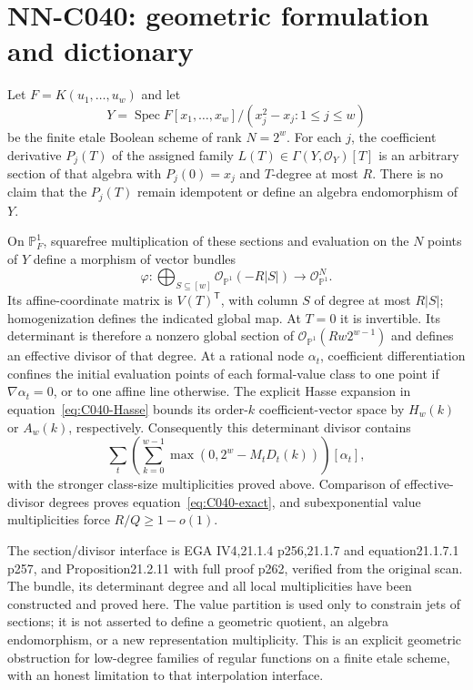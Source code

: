 \section{NN-C040: geometric formulation and dictionary}
\begin{geometricstatement}[NN-C040]
Let $F=K(u_1,\ldots,u_w)$ and let
\[
             Y=\operatorname{Spec}
             F[x_1,\ldots,x_w]/(x_j^2-x_j:1\le j\le w)
\]
be the finite etale Boolean scheme of rank $N=2^w$. For each $j$, the coefficient derivative $P_j(T)$ of the assigned family $L(T)\in\Gamma(Y,\mathcal O_Y)[T]$ is an arbitrary section of that algebra with $P_j(0)=x_j$ and $T$-degree at most $R$. There is no claim that the $P_j(T)$ remain idempotent or define an algebra endomorphism of $Y$.

On $\mathbb P^1_F$, squarefree multiplication of these sections and evaluation on the $N$ points of $Y$ define a morphism of vector bundles
\[
 \varphi:\bigoplus_{S\subseteq[w]}
                  \mathcal O_{\mathbb P^1}(-R|S|)
                 \longrightarrow\mathcal O_{\mathbb P^1}^{N}.
\]
Its affine-coordinate matrix is $V(T)^{\mathsf T}$, with column $S$ of degree at most $R|S|$; homogenization defines the indicated global map. At $T=0$ it is invertible. Its determinant is therefore a nonzero global section of
$\mathcal O_{\mathbb P^1}(Rw2^{w-1})$ and defines an effective divisor of that degree. At a rational node $\alpha_t$, coefficient differentiation confines the initial evaluation points of each formal-value class to one point if $\nabla\alpha_t=0$, or to one affine line otherwise. The explicit Hasse expansion in equation~\eqref{eq:C040-Hasse} bounds its order-$k$ coefficient-vector space by $H_w(k)$ or $A_w(k)$, respectively. Consequently this determinant divisor contains
\[
 \sum_t\left(\sum_{k=0}^{w-1}
            \max(0,2^w-M_tD_t(k))\right)[\alpha_t],
\]
with the stronger class-size multiplicities proved above. Comparison of effective-divisor degrees proves equation~\eqref{eq:C040-exact}, and subexponential value multiplicities force $R/Q\ge1-o(1)$.

The section/divisor interface is EGA IV4,21.1.4 p256,21.1.7 and equation21.1.7.1 p257, and Proposition21.2.11 with full proof p262, verified from the original scan. The bundle, its determinant degree and all local multiplicities have been constructed and proved here. The value partition is used only to constrain jets of sections; it is not asserted to define a geometric quotient, an algebra endomorphism, or a new representation multiplicity. This is an explicit geometric obstruction for low-degree families of regular functions on a finite etale scheme, with an honest limitation to that interpolation interface.


\end{geometricstatement}
